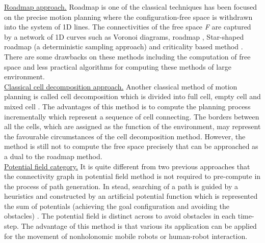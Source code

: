 \noindent\uline{Roadmap approach.} 
Roadmap is one of the classical techniques has been focused on the precise motion planning where the configuration-free space is withdrawn into the system of 1D lines. The connectivities of the free space \textit{F} are captured by a network of 1D curves such as Voronoi diagrams, roadmap \cite{Canny88_PhDThesis}, Star-shaped roadmap (a deterministic sampling approach) \cite{Varadhan05_StarshapedRM} and criticality based method \cite{Latombe99_JourneyRobotics}. There are some drawbacks on these methods including the computation of free space and less practical algorithms for computing these methods of large environment.\\

%				
\noindent\uline{Classical cell decomposition approach.}
Another classical method of motion planning is called cell decomposition which is divided into full cell, empty cell and mixed cell \cite{Latombe91_FastPlaner}. The advantages of this method is to compute the planning process incrementally which represent a sequence of cell connecting. The borders between all the cells, which are assigned as the function of the environment, may represent the favourable circumstances of the cell decomposition method. However, the method is still not to compute the free space precisely that can be approached as a dual to the roadmap method.\\

%				
\noindent\uline{Potential field category.} 
It is quite different from two previous approaches that the connectivity graph in potential field method is not required to pre-compute in the process of path generation. In stead, searching of a path is guided by a heuristics and constructed by an artificial potential function which is represented the sum of potentials (achieving the goal configuration and avoiding the obstacles) \cite{Khatib85_ObstacleAvoidance}. The potential field is distinct across to avoid obstacles in each time-step. The advantage of this method is that various its application can be applied for the movement of nonholonomic mobile robots or human-robot interaction. \\




